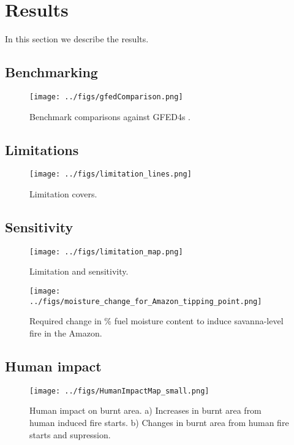 \section{Results}\label{results}
In this section we describe the results.

\subsection{Benchmarking}

\begin{figure}[!ht]
  \centering
    \texttt{[image: ../figs/gfedComparison.png]}
  \caption{Benchmark comparisons against GFED4s \citep{Giglio2013}.}
\end{figure}

\subsection{Limitations}

\begin{figure}[!ht]
  \centering
    \texttt{[image: ../figs/limitation\_lines.png]}

  \caption{Limitation covers.}
\end{figure}


\subsection{Sensitivity}

\begin{figure}[!ht]
  \centering
    \texttt{[image: ../figs/limitation\_map.png]}

  \caption{Limitation and sensitivity.}
\end{figure}

\begin{figure}[!ht]
  \centering
    \texttt{[image: ../figs/moisture\_change\_for\_Amazon\_tipping\_point.png]}

  \caption{Required change in \% fuel moisture content to induce savanna-level fire in the Amazon.}
\end{figure}


\subsection{Human impact}

\begin{figure}[!ht]
  \centering
    \texttt{[image: ../figs/HumanImpactMap\_small.png]}

  \caption{Human impact on burnt area.
            a) Increases in burnt area from human induced fire starts.
            b) Changes in burnt area from human fire starts and supression.}
\end{figure}

